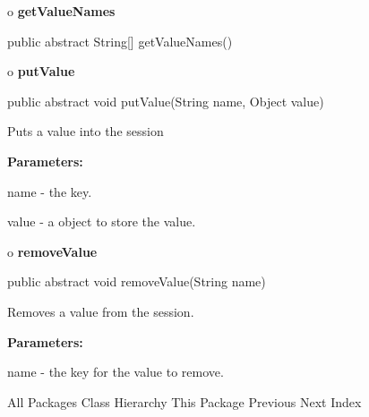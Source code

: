 o {\bf getValueNames} 

\begin{PRE}
 public abstract String[] getValueNames()
\end{PRE}

o {\bf putValue} 

\begin{PRE}
 public abstract void putValue(String name,
                               Object value)
\end{PRE}

\begin{description}
\htmlDD Puts a value into the session 

\begin{description}
\item {\bf Parameters:}  

name - the key.  

value - a object to store the value.  
\end{description}

\end{description}

o {\bf removeValue} 

\begin{PRE}
 public abstract void removeValue(String name)
\end{PRE}

\begin{description}
\htmlDD Removes a value from the session. 

\begin{description}
\item {\bf Parameters:}  

name - the key for the value to remove.  
\end{description}

\end{description}

\htmlHR

\begin{PRE}
All Packages  Class Hierarchy  This Package  Previous  Next  Index
\end{PRE}

